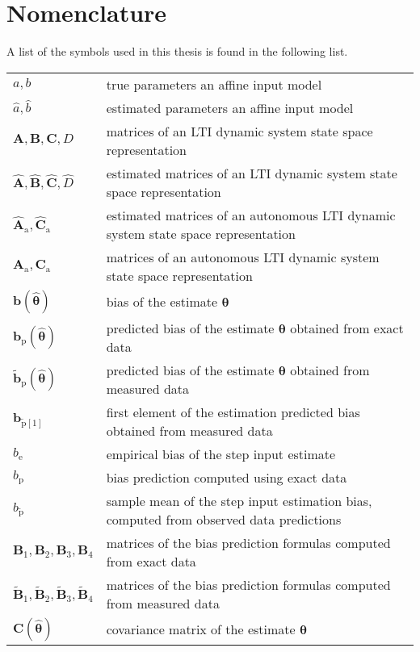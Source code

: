 \chapter*{Nomenclature}

\color{blue}
A list of the symbols used in this thesis is found in the following list.
\begin{longtable}[c]{>{\raggedleft}p{}>{\raggedright}p{}}
${a}, {b}$  &  true parameters an affine input model \tabularnewline
$\widehat{a}, \widehat{b}$  &  estimated parameters an affine input model \tabularnewline
$\mathbf{A}, \mathbf{B}, \mathbf{C}, D$  &   matrices of an LTI dynamic system state space representation  \tabularnewline
$\widehat{\mathbf{A}}, \widehat{\mathbf{B}}, \widehat{\mathbf{C}}, \widehat{D}$  &   estimated matrices of an LTI dynamic system state space representation  \tabularnewline
$\widehat{\mathbf{A}}_\text{a}, \widehat{\mathbf{C}}_\text{a}$  &  estimated matrices of an autonomous LTI dynamic system state space representation \tabularnewline
$\mathbf{A}_\text{a}, \mathbf{C}_\text{a}$  &  matrices of an autonomous LTI dynamic system state space representation \tabularnewline
$\mathbf{b} \left(\widehat{\bm{\theta}} \right)$  &  bias of the estimate $\bm{\theta}$  \tabularnewline
$\mathbf{b}_{\mathrm{p}} \left( \widehat{\bm{\theta}} \right)$  &  predicted bias of the estimate $\bm{\theta}$ obtained from exact data \tabularnewline
$\widetilde{\mathbf{b}}_{\mathrm{p}} \left( \widehat{\bm{\theta}} \right)$  &  predicted bias of the estimate $\bm{\theta}$ obtained from measured data \tabularnewline
$\mathbf{b}_{\widetilde{\mathrm{p}} \left[1\right]}$   &  first element of the estimation predicted bias obtained from measured data \tabularnewline
$b_\mathrm{e}$  &  empirical bias of the step input estimate  \tabularnewline
$b_{\mathrm{p}}$  &  bias prediction computed using exact data   \tabularnewline
$b_{\widetilde{\mathrm{p}}}$  &  sample mean of the step input estimation bias, computed  from observed data predictions   \tabularnewline
$\mathbf{B}_1, \mathbf{B}_2, \mathbf{B}_3, \mathbf{B}_4$  &  matrices of the bias prediction formulas computed from exact data  \tabularnewline
$\widetilde{\mathbf{B}}_1, \widetilde{\mathbf{B}}_2, \widetilde{\mathbf{B}}_3, \widetilde{\mathbf{B}}_4$  &  matrices of the bias prediction formulas computed from measured data  \tabularnewline
$\mathbf{C} \left( \widehat{\bm{\theta}} \right)$  &  covariance matrix of the estimate $\bm{\theta}$  \tabularnewline

\end{longtable}
